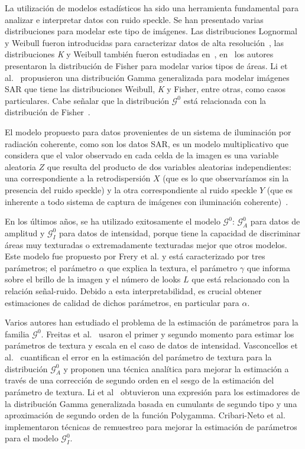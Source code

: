 La utilización de modelos estadísticos ha sido una herramienta fundamental para analizar e interpretar datos con ruido speckle. Se han presentado varias distribuciones para modelar este tipo de imágenes. Las distribuciones Lognormal y Weibull fueron introducidas para caracterizar datos de alta resolución~\cite{oliverquegan98}, las distribuciones \textit{K} y Weibull también fueron estudiadas en~\cite{Oliver1993}, en~\cite{Tison2004} los autores presentaron la distribución de Fisher para modelar varios tipos de áreas. Li et al.~\cite{Li2011} propusieron una distribución Gamma generalizada para modelar imágenes SAR que tiene las distribuciones Weibull, \textit{K} y Fisher, entre otras, como casos particulares. Cabe señalar que la distribución $\mathcal{G}^0$ está relacionada con la distribución de Fisher~\cite{MejailJacoboFreryBustos:IJRS}.

El modelo propuesto para datos provenientes de un sistema de iluminación por radiación coherente, como son los datos SAR, es un modelo multiplicativo que considera que el valor observado en cada celda de la imagen es una variable aleatoria $Z$ que resulta del producto de dos variables aleatorias independientes: una correspondiente a la retrodispersión $X$ (que es lo que observaríamos sin la presencia del ruido speckle) y la otra correspondiente al ruido speckle $Y$ (que es inherente a todo sistema de captura de imágenes con iluminación coherente)~\cite{oliverquegan98}. 

En los últimos años, se ha utilizado exitosamente el modelo $\mathcal{G}^0$: $\mathcal{G}_A^0$ para datos de amplitud y $\mathcal G_I^0$ para datos de intensidad, porque tiene la capacidad de discriminar áreas muy texturadas o extremadamente texturadas mejor que otros modelos. Este modelo fue propuesto por Frery et al. \cite{Frery97} y está caracterizado por tres parámetros; el parámetro $\alpha$ que explica la textura, el parámetro $\gamma $ que informa sobre el brillo de la imagen y el número de looks $L$ que está relacionado con la relación señal-ruido.
Debido a esta interpretabilidad, es crucial obtener estimaciones de calidad de dichos parámetros, en particular para $\alpha$.

Varios autores han estudiado el problema de la estimación de parámetros para la familia $\mathcal G^0$. Freitas et al.~\cite{Freitas2005} usaron el primer y segundo momento para estimar los parámetros de textura y escala en el caso de datos de intensidad.
Vasconcellos et al.~\cite{VasconcellosFrerySilva:CompStat} cuantifican el error en la estimación del parámetro de textura para la distribución $\mathcal G_A^0$ y proponen una técnica analítica para mejorar la estimación a través de una corrección de segundo orden en el sesgo de la estimación del parámetro de textura. Li et al~\cite{Li2011} obtuvieron una expresión para los estimadores de la distribución Gamma generalizada basada en cumulants de segundo tipo y una aproximación de segundo orden de la función Polygamma. Cribari-Neto et al.~\cite{CribariFrerySilva:CSDA} implementaron técnicas de remuestreo para mejorar la estimación de parámetros para el modelo $\mathcal G_I^0$.

